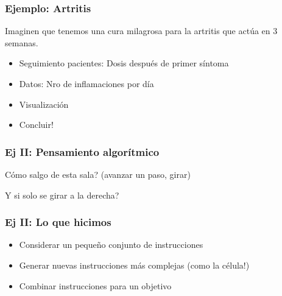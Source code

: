 \documentclass[14pt,aspectratio=169,xcolor=dvipsnames]{beamer}
\begin{document}
\begin{frame}[t]\frametitle{Ejemplo: Artritis}
Imaginen que tenemos una cura milagrosa para la artritis que actúa en 3 semanas. 
\begin{itemize}
    \item<1-> Seguimiento pacientes: Dosis después de primer síntoma
    \item<2-> Datos: Nro de inflamaciones por día
    \item<3-> Visualización
    \item<4-> Concluir!
\end{itemize}
\end{frame}
\begin{frame}\frametitle{Ej II: Pensamiento algorítmico}
Cómo salgo de esta sala? (avanzar un paso, girar)

\vspace{2cm}
\pause Y si solo se girar a la derecha?

\end{frame}
\begin{frame}\frametitle{Ej II: Lo que hicimos}
    \begin{itemize}
        \item Considerar un pequeño conjunto de instrucciones
        \item Generar nuevas instrucciones más complejas {\color{gray}(como la célula!)}
        \item Combinar instrucciones para un objetivo
    \end{itemize}
\end{frame}
\end{document}
